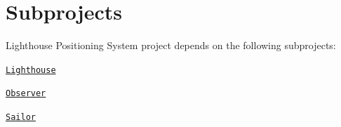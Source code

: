 \chapter{Subprojects }
\hypertarget{subprojects}{}\label{subprojects}
Lighthouse Positioning System project depends on the following subprojects:\+


\begin{DoxyItemize}
\item \href{../../../Lighthouse/Doxygen_Lighthouse/output/html/index.html}{\texttt{Lighthouse}}
\item \href{../../../Observer/Doxygen_Observer/output/html/index.html}{\texttt{Observer}}
\item \href{../../../Sailor/Doxygen_Sailor/output/html/index.html}{\texttt{Sailor}} 
\end{DoxyItemize}